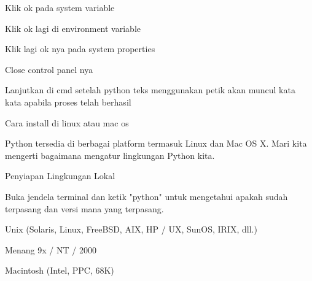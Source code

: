 \vspace{14pt}
\noindent 
{\fontsize{14pt}{14pt}\selectfont Klik ok pada system variable \\} \par
\noindent 
{\fontsize{14pt}{14pt}\selectfont Klik ok lagi di environment variable \\} \par
\vspace{14pt}
\noindent 
{\fontsize{14pt}{14pt}\selectfont Klik lagi ok nya pada system properties \\} \par
\vspace{14pt}
\noindent 
{\fontsize{14pt}{14pt}\selectfont Close control panel nya \\} \par
\vspace{14pt}
\noindent 
{\fontsize{14pt}{14pt}\selectfont Lanjutkan di cmd setelah python teks menggunakan petik akan muncul kata kata apabila proses telah berhasil \\} \par
\vspace{14pt}
\noindent 
{\fontsize{14pt}{14pt}\selectfont Cara install di linux atau mac os \\} \par
\vspace{14pt}
\noindent 
{\fontsize{14pt}{14pt}\selectfont Python tersedia di berbagai platform termasuk Linux dan Mac OS X. Mari kita mengerti bagaimana mengatur lingkungan Python kita. \\} \par
\vspace{14pt}
\noindent 
{\fontsize{14pt}{14pt}\selectfont Penyiapan Lingkungan Lokal \\} \par
\noindent 
{\fontsize{14pt}{14pt}\selectfont Buka jendela terminal dan ketik "python" untuk mengetahui apakah sudah terpasang dan versi mana yang terpasang. \\} \par
\vspace{14pt}
\noindent 
{\fontsize{14pt}{14pt}\selectfont Unix (Solaris, Linux, FreeBSD, AIX, HP / UX, SunOS, IRIX, dll.) \\} \par
\noindent 
{\fontsize{14pt}{14pt}\selectfont Menang 9x / NT / 2000 \\} \par
\noindent 
{\fontsize{14pt}{14pt}\selectfont Macintosh (Intel, PPC, 68K) \\} \par
